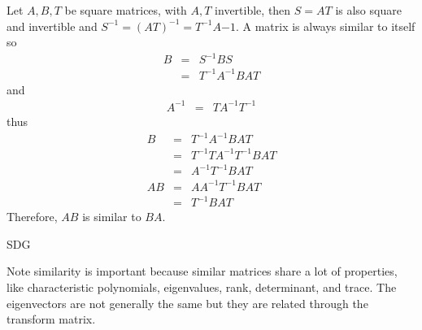 \documentclass{article}
\begin{document}
Let $A,B,T$ be square matrices, with $A,T$ invertible, then $S=AT$ is also square and invertible and $S^{-1}=(AT)^{-1}=T^{-1}A{-1}$.  A matrix is always similar to itself so
\begin{eqnarray}
B &=& S^{-1}BS \\
  &=& T^{-1}A^{-1}BAT
\end{eqnarray}
and
\begin{eqnarray}
A^{-1} &=& TA^{-1}T^{-1}
\end{eqnarray}
thus
\begin{eqnarray}
B  &=& T^{-1}A^{-1}BAT \\
   &=& T^{-1}TA^{-1}T^{-1}BAT  \\
   &=& A^{-1}T^{-1}BAT \\
AB &=& AA^{-1}T^{-1}BAT \\
   &=& T^{-1}BAT
\end{eqnarray}
Therefore, $AB$ is similar to $BA$.

SDG

Note similarity is important because similar matrices share a lot of properties, like characteristic polynomials, eigenvalues, rank, determinant, and trace. The eigenvectors are not generally the same but they are related through the transform matrix.
\end{document}
